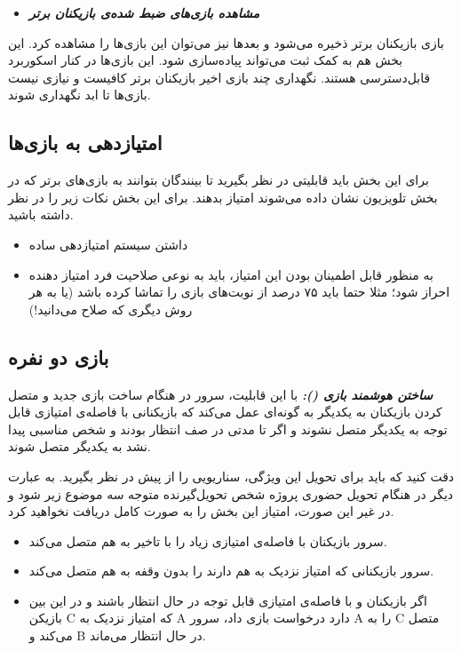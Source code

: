 \documentclass[]{article}
\begin{document}
\begin{itemize}
	\item \textbf{\emph{مشاهده بازی‌های ضبط شده‌ی بازیکنان برتر}}
\end{itemize}
بازی بازیکنان برتر ذخیره می‌شود و بعد‌ها نیز می‌توان این بازی‌ها را مشاهده کرد. این بخش هم به کمک ثبت  می‌تواند پیاده‌سازی شود.
این بازی‌ها در کنار اسکوربرد قابل‌دسترسی هستند. نگهداری چند بازی اخیر بازیکنان برتر کافیست و نیازی نیست بازی‌ها تا ابد نگهداری شوند.

\subsection*{{\titr امتیازدهی به بازی‌ها}}

برای این بخش باید قابلیتی در نظر بگیرید تا بینندگان بتوانند به بازی‌های برتر که در بخش تلویزیون نشان داده می‌شوند امتیاز بدهند. برای این بخش نکات زیر را در نظر داشته باشید.
\begin{itemize}
	\item داشتن سیستم امتیازدهی ساده
	\item به منظور قابل اطمینان بودن این امتیاز، باید به نوعی صلاحیت فرد امتیاز دهنده احراز شود؛ مثلا حتما باید ۷۵ درصد از نوبت‌های بازی را تماشا کرده باشد (یا به هر روش دیگری که صلاح می‌دانید!)
\end{itemize}

\subsection*{{\titr بازی دو نفره}}

\textbf{\emph{ساختن هوشمند بازی ():}}
با این قابلیت، سرور در هنگام ساخت بازی جدید و متصل کردن بازیکنان به یکدیگر به گونه‌ای عمل می‌کند که بازیکنانی با فاصله‌ی امتیازی قابل توجه به یکدیگر متصل نشوند و اگر تا مدتی در صف انتظار بودند و شخص مناسبی پیدا نشد به یکدیگر متصل شوند.

دقت کنید که باید برای تحویل این ویژگی، سناریویی را از پیش در نظر بگیرید. به عبارت دیگر در هنگام تحویل حضوری پروژه شخص تحویل‌گیرنده متوجه سه موضوع زیر شود و در غیر این صورت، امتیاز این بخش را به صورت کامل دریافت نخواهید کرد.

\begin{itemize}
	\item سرور بازیکنان با فاصله‌ی امتیازی زیاد را با تاخیر به هم متصل می‌کند.
	\item سرور بازیکنانی که امتیاز نزدیک به هم دارند را بدون وقفه به هم متصل می‌کند.
	\item اگر بازیکنان  و  با فاصله‌ی امتیازی قابل توجه در حال انتظار باشند و در این بین بازیکن C که امتیاز نزدیک به A دارد درخواست بازی داد، سرور A را به C متصل می‌کند و B در حال انتظار می‌ماند.
\end{itemize}
\end{document}
